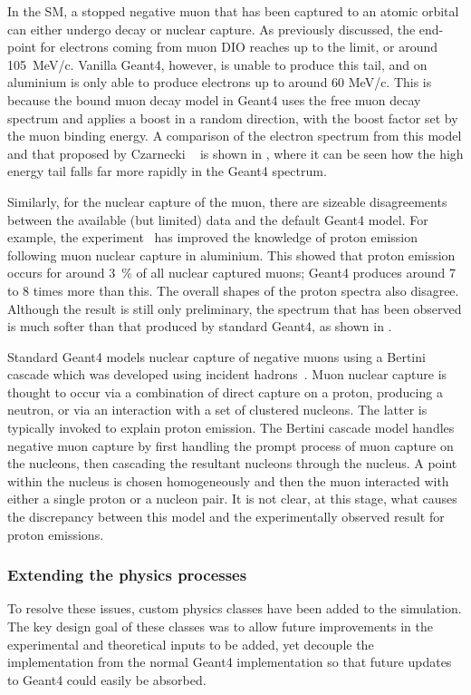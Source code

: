 In the \ac{SM}, a stopped negative muon that has been captured to an atomic orbital can either undergo decay or nuclear capture.
As previously discussed, the end-point for electrons coming from muon \ac{DIO} reaches up to the \mueconv limit, or around 105~MeV/c.  
Vanilla Geant4, however, is unable to produce this tail, and on aluminium is only able to produce electrons up to around 60 MeV/c.  
This is because the bound muon decay model in Geant4 uses the free muon decay spectrum and applies a boost in a random direction, with the boost factor set by the muon binding energy.
A comparison of the electron spectrum from this model and that proposed by Czarnecki \etal~\cite{Czarnecki2011} is shown in , where it can be seen how the high energy tail falls far more rapidly in the Geant4 spectrum.

Similarly, for the nuclear capture of the muon, there are sizeable disagreements between the available (but limited) data and the default Geant4 model.
For example, the \alcap experiment~\cite{AlcapProposal2012} has improved the knowledge of proton emission following muon nuclear capture in aluminium.
This showed that proton emission occurs for around 3~\% of all nuclear captured muons; Geant4 produces around 7 to 8 times more than this.
The overall shapes of the proton spectra also disagree.
Although the \alcap result is still only preliminary, the spectrum that has been observed is much softer than that produced by standard Geant4, as shown in .

Standard Geant4 models nuclear capture of negative muons using a Bertini cascade which was developed using incident hadrons~\cite{Geant4:Bertini}.
Muon nuclear capture is thought to occur via a combination of direct capture on a proton, producing a neutron, or via an interaction with a set of clustered nucleons.
The latter is typically invoked to explain proton emission.
The Bertini cascade model handles negative muon capture by first handling the prompt process of muon capture on the nucleons, then cascading the resultant nucleons through the nucleus.
A point within the nucleus is chosen homogeneously and then the muon interacted with either a single proton or a nucleon pair.
It is not clear, at this stage, what causes the discrepancy between this model and the experimentally observed result for proton emissions.

\subsubsection{Extending the physics processes}
To resolve these issues, custom physics classes have been added to the \COMET simulation.
The key design goal of these classes was to allow future improvements in the experimental and theoretical inputs to be added, yet decouple the implementation from the normal Geant4 implementation so that future updates to Geant4 could easily be absorbed.

